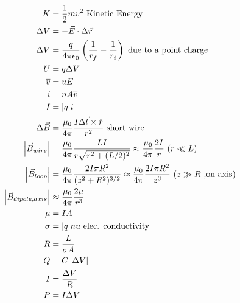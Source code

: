 \begin{multicols}{2}
	
	\begin{minipage}{\columnwidth}
		\begin{align*}
			K&= \frac{1}{2} m v^2\ 	\text{Kinetic Energy}\\
			\Delta V &= -\vec{E}\cdot\Delta\vec{r}\\
			\Delta V & = \frac{q}{4\pi\epsilon_0}\left(\frac{1}{r_f}-\frac{1}{r_i}\right)\ \text{due to a point charge}\\
			U &= q\Delta V\\
			\overline{v}&=uE\\
			i&=nA\overline{v}\\
			I&=|q|i\\
			\Delta \vec{B} &= \kmag \dfrac{I \Delta \vec{l} \times \hat{r}}{r^2}\ \text{short wire}\\
			\left|{\vec{B}}_{wire}\right| &= \kmag \dfrac{LI}{r \sqrt{r^2 + (L/2)^2}} \approx \kmag \dfrac{2I}{r}\ (r \ll L)\\
			\left|{\vec{B}}_{loop}\right| &= \kmag \dfrac{2I \pi R^2}{(z^2 + R^2)^{3/2}} \approx \kmag \dfrac{2I \pi R^2}{z^3}\ (z\gg R\ \text{,on axis})\\
			\left|{\vec{B}}_{dipole,axis}\right| &\approx \kmag \dfrac{2 \mu}{r^3}\\
			\mu &= IA\\
			\sigma&=|q|nu\ \text{elec. conductivity}\\
			R&=\dfrac{L}{\sigma A}\\
			Q&=C\left|\Delta V\right|\\
			I&=\frac{\Delta V}{R}\\
			P&=I\Delta V\\
		\end{align*}
	\end{minipage}
	
\end{multicols}